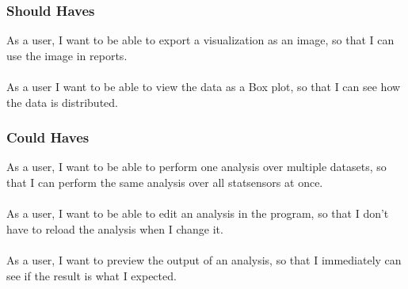 \subsubsection{Should Haves}
As a user, I want to be able to export a visualization as an image, so that I can use the image in reports.
\\\\
As a user I want to be able to view the data as a Box plot, so that I can see how the data is distributed.

\subsubsection{Could Haves}
As a user, I want to be able to perform one analysis over multiple datasets, so that I can perform the same analysis over all statsensors at once.
\\\\
As a user, I want to be able to edit an analysis in the program, so that I don't have to reload the analysis when I change it.
\\\\
As a user, I want to preview the output of an analysis, so that I immediately can see if the result is what I expected.
